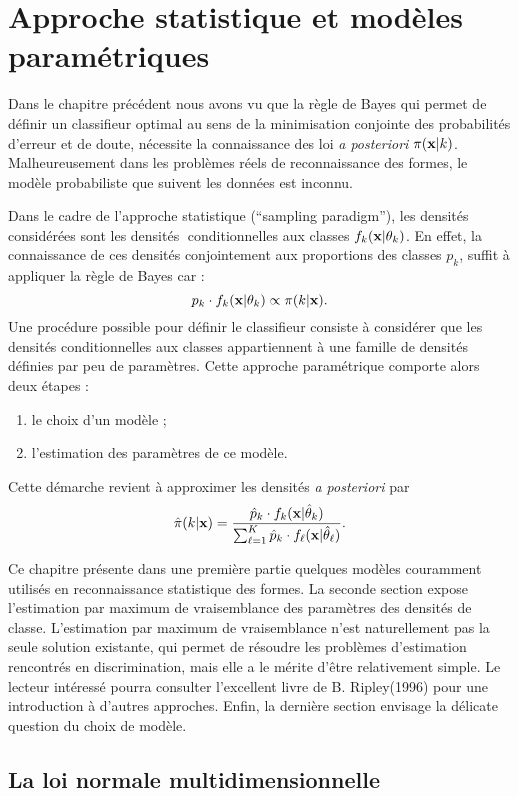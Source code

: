 \chapter{Approche statistique et mod\`eles param\'etriques}
\nocite{Flury1994}
Dans le chapitre pr\'ec\'edent nous avons vu que la r\`egle de Bayes
qui permet de d\'efinir un classifieur optimal au sens de la
minimisation conjointe des probabilit\'es d'erreur et de doute,
n\'ecessite la connaissance des loi {\em a posteriori}
$\pi(\mbox{\bf x} | k)$. Malheureusement dans les probl\`emes r\'eels de 
reconnaissance des formes, le mod\`ele probabiliste que suivent
les donn\'ees est inconnu. 

Dans le cadre de l'approche statistique (``sampling paradigm''), les
densit\'es consid\'er\'ees sont les densit\'es conditionnelles 
aux classes $f_k(\mbox{\bf x} | \theta_k)$. En effet, la connaissance de ces densit\'es
conjointement aux proportions des classes $p_k$,  suffit \`a appliquer
la r\`egle de Bayes car :
$$
p_k \cdot f_k(\mbox{\bf x}|\theta_k) \propto \pi(k | \mbox{\bf x}).
$$
Une proc\'edure possible pour d\'efinir le classifieur consiste \`a
consid\'erer que les densit\'es conditionnelles aux classes appartiennent
\`a une famille de densit\'es d\'efinies par peu de param\`etres. Cette
approche param\'etrique comporte alors deux \'etapes :
\begin{enumerate}
\item le choix d'un mod\`ele ;
\item l'estimation des param\`etres de ce mod\`ele.
\end{enumerate}
Cette d\'emarche revient \`a approximer les densit\'es {\em a posteriori} par
$$
\hat{\pi}(k| \mbox{\bf x})=\frac{\hat{p}_k \cdot f_k(\mbox{\bf x} | \hat{\theta}_k)}{\sum_{\ell=1}^{K} \hat{p}_k \cdot f_\ell(\mbox{\bf x} | \hat{\theta}_\ell)}.
$$  

Ce chapitre pr\'esente dans une premi\`ere partie quelques  mod\`eles 
couramment utilis\'es en reconnaissance statistique des formes.
La seconde section  expose l'estimation par maximum de 
vraisemblance des param\`etres des densit\'es de classe. L'estimation
par maximum de vraisemblance n'est naturellement pas la seule 
solution existante, qui permet de r\'esoudre les probl\`emes 
d'estimation rencontr\'es en discrimination, mais elle a le 
m\'erite d'\^etre relativement simple. Le lecteur int\'eress\'e
pourra consulter l'excellent livre de B. Ripley(1996) pour une introduction
\`a d'autres approches.   Enfin,
la derni\`ere section envisage la d\'elicate question du choix de  mod\`ele.

\section{La loi normale multidimensionnelle}

